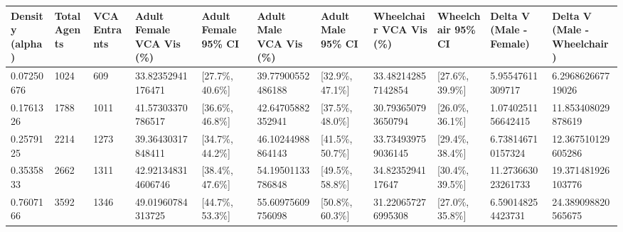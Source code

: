 \begin{tabular}{lllllllllll}
\hline
Density (alpha) & Total Agents & VCA Entrants & Adult Female VCA Vis (\%) & Adult Female 95\% CI & Adult Male VCA Vis (\%) & Adult Male 95\% CI & Wheelchair VCA Vis (\%) & Wheelchair 95\% CI & Delta V (Male - Female) & Delta V (Male - Wheelchair) \\ \hline
0.07250676 & 1024 & 609 & 33.82352941176471 & [27.7\%, 40.6\%] & 39.77900552486188 & [32.9\%, 47.1\%] & 33.482142857142854 & [27.6\%, 39.9\%] & 5.95547611309717 & 6.296862667719026 \\
0.1761326 & 1788 & 1011 & 41.57303370786517 & [36.6\%, 46.8\%] & 42.64705882352941 & [37.5\%, 48.0\%] & 30.793650793650794 & [26.0\%, 36.1\%] & 1.0740251156642415 & 11.853408029878619 \\
0.2579125 & 2214 & 1273 & 39.36430317848411 & [34.7\%, 44.2\%] & 46.10244988864143 & [41.5\%, 50.7\%] & 33.734939759036145 & [29.4\%, 38.4\%] & 6.738146710157324 & 12.367510129605286 \\
0.3535833 & 2662 & 1311 & 42.921348314606746 & [38.4\%, 47.6\%] & 54.19501133786848 & [49.5\%, 58.8\%] & 34.8235294117647 & [30.4\%, 39.5\%] & 11.273663023261733 & 19.371481926103776 \\
0.7607166 & 3592 & 1346 & 49.01960784313725 & [44.7\%, 53.3\%] & 55.60975609756098 & [50.8\%, 60.3\%] & 31.220657276995308 & [27.0\%, 35.8\%] & 6.590148254423731 & 24.389098820565675 \\
\hline
\end{tabular}
